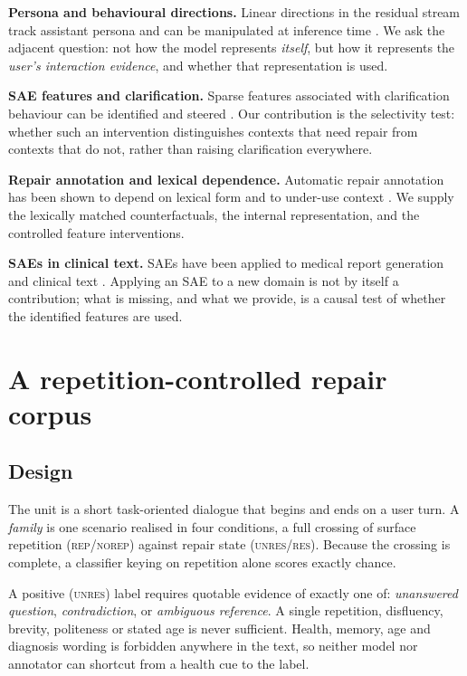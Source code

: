 \documentclass[conference]{IEEEtran}
\begin{document}
\textbf{Persona and behavioural directions.} Linear directions in the residual stream track
assistant persona and can be manipulated at inference time \cite{assistantaxis}. We ask the
adjacent question: not how the model represents \emph{itself}, but how it represents the
\emph{user's interaction evidence}, and whether that representation is used.

\textbf{SAE features and clarification.} Sparse features associated with clarification behaviour
can be identified and steered \cite{clarifysae}. Our contribution is the selectivity test: whether
such an intervention distinguishes contexts that need repair from contexts that do not, rather than
raising clarification everywhere.

\textbf{Repair annotation and lexical dependence.} Automatic repair annotation has been shown to
depend on lexical form and to under-use context \cite{ngo2026}. We supply the lexically matched
counterfactuals, the internal representation, and the controlled feature interventions.

\textbf{SAEs in clinical text.} SAEs have been applied to medical report generation and clinical
text \cite{maira2sae,cast}. Applying an SAE to a new domain is not by itself a contribution; what
is missing, and what we provide, is a causal test of whether the identified features are used.

\section{A repetition-controlled repair corpus}
\label{sec:data}

\subsection{Design}
The unit is a short task-oriented dialogue that begins and ends on a user turn. A \emph{family} is
one scenario realised in four conditions, a full crossing of surface repetition
(\textsc{rep}/\textsc{norep}) against repair state (\textsc{unres}/\textsc{res}). Because the
crossing is complete, a classifier keying on repetition alone scores exactly chance.

A positive (\textsc{unres}) label requires quotable evidence of exactly one of:
\emph{unanswered question}, \emph{contradiction}, or \emph{ambiguous reference}. A single
repetition, disfluency, brevity, politeness or stated age is never sufficient. Health, memory, age
and diagnosis wording is forbidden anywhere in the text, so neither model nor annotator can
shortcut from a health cue to the label.
\end{document}
